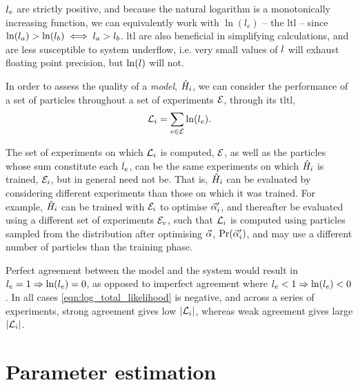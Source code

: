$l_{e}$ are strictly positive, and because the natural logarithm is a monotonically increasing function, 
    we can equivalently work with $\ln{(l_e)}$ --  the \gls{ltl} -- 
    since $\ln(l_a) > \ln(l_b) \iff l_a > l_b$. 
\gls{ltl} are also beneficial in simplifying calculations, 
    and are less susceptible to system underflow, 
    i.e. very small values of $l$ will exhaust floating point precision, 
    but $\ln(l)$ will not. 
\par 

In order to assess the quality of a \emph{model}, $\hat{H}_i$, 
    we can consider the performance of a set of \glspl{particle} throughout a set of \glspl{experiment} ${ \mathcal{E} }$, 
    through its \gls{tltl}, 
\begin{equation}
    \label{eqn:log_total_likelihood}
    {\mathcal{L}}_{i} = \sum\limits_{e \in { \mathcal{E} }} \ln(l_{e}).    
\end{equation}

The set of \glspl{experiment} on which ${\mathcal{L}}_{i}$ is computed, ${ \mathcal{E} }$, 
    as well as the \glspl{particle} whose sum constitute each $l_{e}$,
    can be the same \glspl{experiment} on which $\hat{H}_i$ is trained, ${ \mathcal{E} }_i$, but in general need not be.
That is, $\hat{H}_i$ can be evaluated by considering different \glspl{experiment} than those on which it was trained.
For example, $\hat{H}_i$ can be trained with ${ \mathcal{E} }_i$ to optimise $\vec{\alpha}_i^{\prime}$, 
    and thereafter be evaluated using a different set of \glspl{experiment} ${ \mathcal{E} }_v$, 
    such that ${\mathcal{L}}_{i}$ is computed using \glspl{particle} sampled from the distribution after optimising $\vec{\alpha}$, 
    $\Pr(\vec{\alpha}_i^{\prime})$, and may use a different number of \glspl{particle} than the training phase. 
\par 

Perfect agreement between the model and the system would result in $l_{e}=1 \Rightarrow \ln(l_{e})=0$, 
    as opposed to imperfect agreement where $l_{e} < 1 \Rightarrow \ln(l_{e}) < 0$.
In all cases \cref{eqn:log_total_likelihood} is negative, 
    and across a series of \glspl{experiment},
    strong agreement gives low $\lvert {\mathcal{L}}_{i} \rvert $, 
    whereas weak agreement gives large $\lvert {\mathcal{L}}_{i} \rvert $. 


\section{Parameter estimation}

